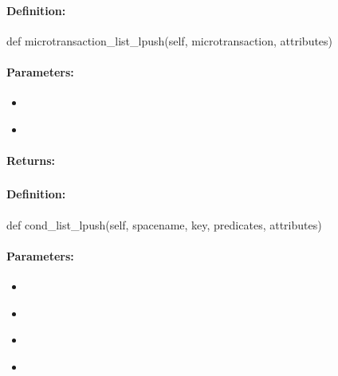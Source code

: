 \paragraph{Definition:}
\begin{pythoncode}
def microtransaction_list_lpush(self, microtransaction, attributes)
\end{pythoncode}

\paragraph{Parameters:}
\begin{itemize}[noitemsep]
\item {}\\

\item {}\\

\end{itemize}

\paragraph{Returns:}


\pagebreak
\subsubsection{}
\label{api:python:cond_list_lpush}


\paragraph{Definition:}
\begin{pythoncode}
def cond_list_lpush(self, spacename, key, predicates, attributes)
\end{pythoncode}

\paragraph{Parameters:}
\begin{itemize}[noitemsep]
\item {}\\

\item {}\\

\item {}\\

\item {}\\

\end{itemize}


